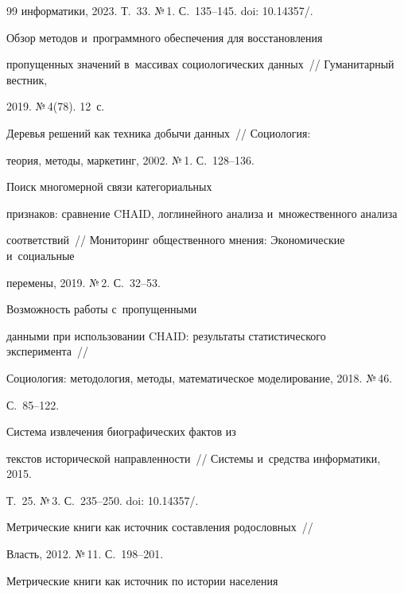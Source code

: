 {{\begin{thebibliography}{99}
информатики, 2023. Т.~33. №\,1. С.~135--145. doi: 10.14357\!/.


  




   Обзор методов и~программного обеспечения для восстановления 


пропущенных значений в~массивах социологических данных~/\!\!/ Гуманитарный вестник, 


2019. №\,4(78). 12~с.




   Деревья решений как техника добычи данных~/\!\!/ Социология: 


теория, методы, маркетинг, 2002. №\,1. С.~128--136.




   Поиск многомерной связи категориальных 


признаков: сравнение CHAID, логлинейного анализа и~множественного анализа 


соответствий~/\!\!/ Мониторинг общественного мнения: Экономические и~социальные 


перемены, 2019. №\,2. С.~32--53.




   Возможность работы с~пропущенными 


данными при использовании CHAID: результаты статистического эксперимента~/\!\!/ 


Социология: методология, методы, математическое моделирование, 2018. №\,46.  


С.~85--122.




   Система извлечения биографических фактов из 


текстов исторической направленности~/\!\!/ Сис\-те\-мы и~средства информатики, 2015. 


Т.~25. №\,3. С.~235--250. doi: 10.14357\!/.




   Метрические книги как источник составления родословных~/\!\!/ 


Власть, 2012. №\,11. С.~198--201.




   Метрические книги как источник по истории населения 



\end{thebibliography}}}
